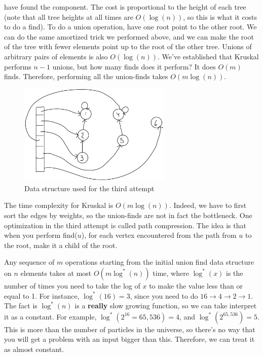 \begin{enumerate}
    have found the component. The cost is proportional to the height
    of each tree (note that all tree heights at all
    times are $O(\log(n))$, so this is what it costs to do a find). 
    To do a union operation, have one root point to the
    other root. We can do the same amortized trick we performed above,
    and we can make the root of the tree with fewer elements point up
    to the root of the other tree. Unions of arbitrary pairs of
    elements is also $O(\log(n))$. We've established that Kruskal
    performs $n - 1$ unions, but how many finds does it perform? It
    does $O(m)$ finds. Therefore, performing all the union-finds takes
    $O(m\log(n))$.
\end{enumerate}

\begin{figure}[hpt]
    \centering
    \includegraphics[width=0.65\textwidth]{figures/kruskal.jpeg}
    \caption{Data structure used for the third attempt}
    \label{fig:kruskal}
\end{figure}

The time complexity for Kruskal is $O(m\log(n))$. Indeed, we have to
first sort the edges by weights, so the union-finds are not in fact
the bottleneck. One optimization in the third attempt is called path
compression. The idea is that when you perform find($u$), for each
vertex encountered from the path from $u$ to the root, make it a child
of the root. 

Any sequence of $m$ operations starting from the initial
union find data structure on $n$ elements takes at most $O(m\log^*
(n))$ time, where $\log^*(x)$ is the number of times you need to take
the log of $x$ to make the value less than or equal to 1. For
instance,
$\log^*(16) = 3$, since you need to do $16 \to 4 \to 2 \to 1$.
The fact is $\log^*(n)$ is a \textbf{really} slow growing
function, so we can take interpret it as a constant. For example,
$\log^*(2^{16} = 65,536) = 4$, and $\log^*(2^{65,536}) = 5$. This is
more than the number of particles in the universe, so there's no way
that you will get a problem with an input bigger than this. Therefore,
we can treat it as almost constant.

